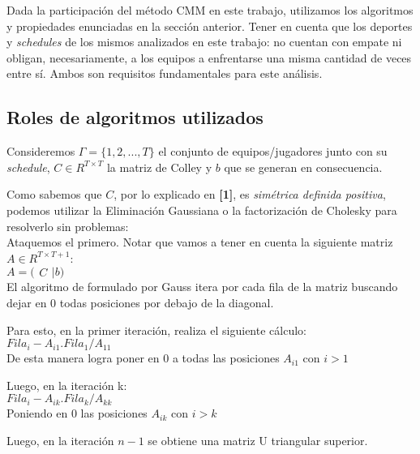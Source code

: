 Dada la participaci\'on del m\'etodo CMM en este trabajo, utilizamos los algoritmos y propiedades enunciadas en la secci\'on anterior. Tener en cuenta que los deportes y \textit{schedules} de los mismos analizados en este trabajo: no cuentan con empate ni obligan, necesariamente, a los equipos a enfrentarse una misma cantidad de veces entre s\'i. Ambos son requisitos fundamentales para este an\'alisis.

\subsection{Roles de algoritmos utilizados}

Consideremos $\Gamma = \{1,2,...,T\}$ el conjunto de equipos/jugadores junto con su \textit{schedule}, $C \in R^{T \times T}$ la matriz de Colley y $b$ que se generan en consecuencia.

Como sabemos que $C$, por lo explicado en \textbf{[1]}, es \textit{sim\'etrica definida positiva}, podemos utilizar la Eliminaci\'on Gaussiana o la factorizaci\'on de Cholesky para resolverlo sin problemas: \\

Ataquemos el primero. Notar que vamos a tener en cuenta la siguiente matriz $A \in R^{T \times T+1}$: \\

$A = \Big(
\begin{matrix}
C
\end{matrix}
\vert
b
\Big)$ \\

El algoritmo de formulado por Gauss itera por cada fila de la matriz buscando dejar en 0 todas posiciones por debajo de la diagonal.

Para esto, en la primer iteraci\'on, realiza el siguiente c\'alculo: \\

$Fila_{i} - A_{i1} . Fila_{1} / A_{11}$ \\

De esta manera logra poner en $0$ a todas las posiciones $A_{i1}$ con $i > 1$

Luego, en la iteraci\'on k: \\

$Fila_{i} - A_{ik} . Fila_{k} / A_{kk}$ \\

Poniendo en $0$ las posiciones $A_{ik}$ con $i > k$

Luego, en la iteraci\'on $n-1$ se obtiene una matriz U triangular superior.

